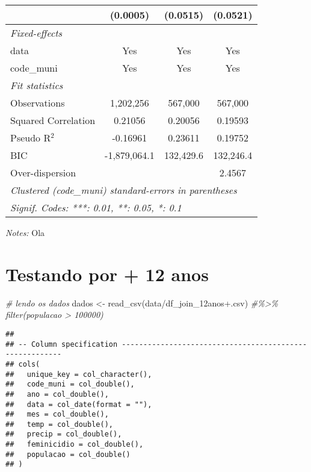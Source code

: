 \documentclass[
]{article}
\newenvironment{Shaded}{\begin{snugshade}}{\end{snugshade}}
\newcommand{\CommentTok}[1]{\textcolor[rgb]{0.56,0.35,0.01}{\textit{#1}}}
\newcommand{\FunctionTok}[1]{\textcolor[rgb]{0.00,0.00,0.00}{#1}}
\newcommand{\NormalTok}[1]{#1}
\newcommand{\OtherTok}[1]{\textcolor[rgb]{0.56,0.35,0.01}{#1}}
\newcommand{\StringTok}[1]{\textcolor[rgb]{0.31,0.60,0.02}{#1}}
\begin{document}
\begin{tabular}{lccc}
  &(0.0005) & (0.0515) & (0.0521)\\
\midrule \emph{Fixed-effects}&   &   &  \\
data & Yes & Yes & Yes\\
code\_muni & Yes & Yes & Yes\\
\midrule \emph{Fit statistics}&  & & \\
Observations & 1,202,256&567,000&567,000\\
Squared Correlation & 0.21056&0.20056&0.19593\\
Pseudo R$^2$ & -0.16961&0.23611&0.19752\\
BIC & -1,879,064.1&132,429.6&132,246.4\\
Over-dispersion & &&2.4567\\
\midrule\midrule\multicolumn{4}{l}{\emph{Clustered (code\_muni) standard-errors in parentheses}}\\
\multicolumn{4}{l}{\emph{Signif. Codes: ***: 0.01, **: 0.05, *: 0.1}}\\
\end{tabular}

\medskip \emph{Notes:} Ola

\hypertarget{testando-por-12-anos}{%
\section{Testando por + 12 anos}\label{testando-por-12-anos}}

\begin{Shaded}
\begin{Highlighting}[]
\CommentTok{\# lendo os dados}
\NormalTok{dados }\OtherTok{\textless{}{-}} \FunctionTok{read\_csv}\NormalTok{(}\StringTok{\textquotesingle{}data/df\_join\_12anos+.csv\textquotesingle{}}\NormalTok{) }\CommentTok{\#\%\textgreater{}\% filter(populacao \textgreater{} 100000)}
\end{Highlighting}
\end{Shaded}

\begin{verbatim}
## 
## -- Column specification --------------------------------------------------------
## cols(
##   unique_key = col_character(),
##   code_muni = col_double(),
##   ano = col_double(),
##   data = col_date(format = ""),
##   mes = col_double(),
##   temp = col_double(),
##   precip = col_double(),
##   feminicidio = col_double(),
##   populacao = col_double()
## )
\end{verbatim}
\end{document}
